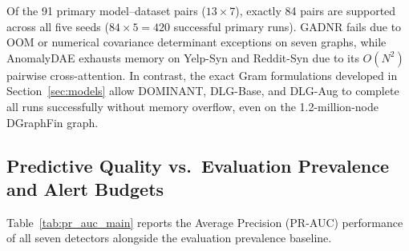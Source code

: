 \documentclass[11pt,a4paper]{article}
\begin{document}
Of the 91 primary model--dataset pairs ($13 \times 7$), exactly 84 pairs are supported across all five seeds ($84 \times 5 = 420$ successful primary runs). GADNR fails due to OOM or numerical covariance determinant exceptions on seven graphs, while AnomalyDAE exhausts memory on Yelp-Syn and Reddit-Syn due to its $O(N^2)$ pairwise cross-attention. In contrast, the exact Gram formulations developed in Section~\ref{sec:models} allow DOMINANT, DLG-Base, and DLG-Aug to complete all runs successfully without memory overflow, even on the 1.2-million-node DGraphFin graph.

\subsection{Predictive Quality vs.\ Evaluation Prevalence and Alert Budgets}
Table~\ref{tab:pr_auc_main} reports the Average Precision (PR-AUC) performance of all seven detectors alongside the evaluation prevalence baseline.
\end{document}

